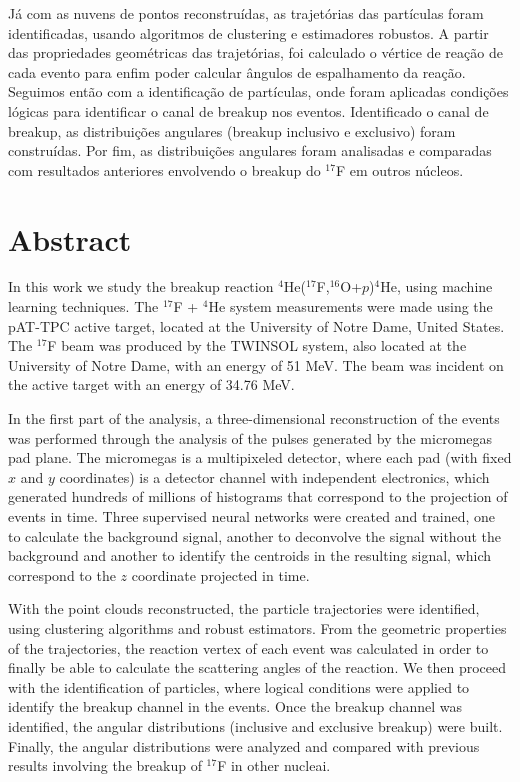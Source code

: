 \documentclass[a4paper,12pt,oneside]{book}
\begin{document}
\par Já com as nuvens de pontos reconstruídas, as trajetórias das partículas foram identificadas, usando algoritmos de clustering e estimadores robustos. A partir das propriedades geométricas das trajetórias, foi calculado o vértice de reação de cada evento para enfim poder calcular ângulos de espalhamento da reação. Seguimos então com a identificação de partículas, onde foram aplicadas condições lógicas para identificar o canal de breakup nos eventos. Identificado o canal de breakup, as distribuições angulares (breakup inclusivo e exclusivo) foram construídas. Por fim, as distribuições angulares foram analisadas e comparadas com resultados anteriores envolvendo o breakup do $^{17}$F em outros núcleos.
 

\chapter*{Abstract}

\par In this work we study the breakup reaction $^4$He($^{17}$F,$^{16}$O+$p$)$^4$He, using machine learning techniques. The $^{17}$F + $^4$He system measurements were made using the pAT-TPC active target, located at the University of Notre Dame, United States. The $^{17}$F beam was produced by the TWINSOL system, also located at the University of Notre Dame, with an energy of 51 MeV. The beam was incident on the active target with an energy of 34.76 MeV.

\par In the first part of the analysis, a three-dimensional reconstruction of the events was performed through the analysis of the pulses generated by the micromegas pad plane. The micromegas is a multipixeled detector, where each pad (with fixed $x$ and $y$ coordinates) is a detector channel with independent electronics, which generated hundreds of millions of histograms that correspond to the projection of events in time. Three supervised neural networks were created and trained, one to calculate the background signal, another to deconvolve the signal without the background and another to identify the centroids in the resulting signal, which correspond to the $z$ coordinate projected in time.

\par With the point clouds reconstructed, the particle trajectories were identified, using clustering algorithms and robust estimators. From the geometric properties of the trajectories, the reaction vertex of each event was calculated in order to finally be able to calculate the scattering angles of the reaction. We then proceed with the identification of particles, where logical conditions were applied to identify the breakup channel in the events. Once the breakup channel was identified, the angular distributions (inclusive and exclusive breakup) were built. Finally, the angular distributions were analyzed and compared with previous results involving the breakup of $^{17}$F in other nucleai.
\end{document}
